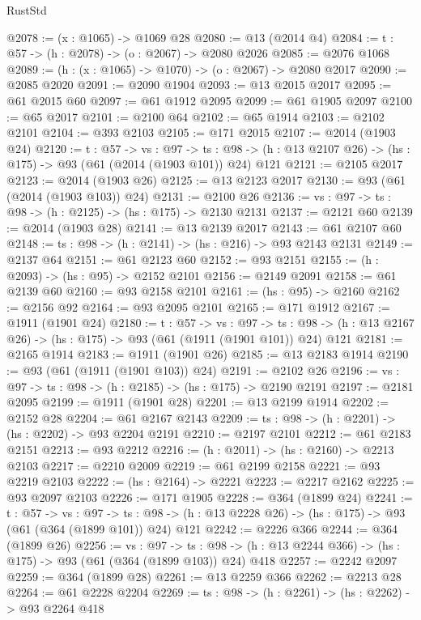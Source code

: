 \begin{lexlean}{RustStd}
\begin{coremodule}
@2078 := (x : @1065) -> @1069 @28
@2080 := @13 (@2014 @4)
@2084 := {t : @57} -> (h : @2078) -> (o : @2067) -> @2080 @2026
@2085 := @2076 @1068
@2089 := (h : (x : @1065) -> @1070) -> (o : @2067) -> @2080 @2017
@2090 := @2085 @2020
@2091 := @2090 @1904
@2093 := @13 @2015 @2017
@2095 := @61 @2015 @60
@2097 := @61 @1912 @2095
@2099 := @61 @1905 @2097
@2100 := @65 @2017
@2101 := @2100 @64
@2102 := @65 @1914
@2103 := @2102 @2101
@2104 := @393 @2103
@2105 := @171 @2015
@2107 := @2014 (@1903 @24)
@2120 := {t : @57} ->
  {vs : @97} ->
  {ts : @98} -> (h : @13 @2107 @26) -> (hs : @175) -> @93 (@61 (@2014 (@1903 @101)) @24) @121
@2121 := @2105 @2017
@2123 := @2014 (@1903 @26)
@2125 := @13 @2123 @2017
@2130 := @93 (@61 (@2014 (@1903 @103)) @24)
@2131 := @2100 @26
@2136 := {vs : @97} -> {ts : @98} -> (h : @2125) -> (hs : @175) -> @2130 @2131
@2137 := @2121 @60
@2139 := @2014 (@1903 @28)
@2141 := @13 @2139 @2017
@2143 := @61 @2107 @60
@2148 := {ts : @98} -> (h : @2141) -> (hs : @216) -> @93 @2143 @2131
@2149 := @2137 @64
@2151 := @61 @2123 @60
@2152 := @93 @2151
@2155 := (h : @2093) -> (hs : @95) -> @2152 @2101
@2156 := @2149 @2091
@2158 := @61 @2139 @60
@2160 := @93 @2158 @2101
@2161 := (hs : @95) -> @2160
@2162 := @2156 @92
@2164 := @93 @2095 @2101
@2165 := @171 @1912
@2167 := @1911 (@1901 @24)
@2180 := {t : @57} ->
  {vs : @97} ->
  {ts : @98} -> (h : @13 @2167 @26) -> (hs : @175) -> @93 (@61 (@1911 (@1901 @101)) @24) @121
@2181 := @2165 @1914
@2183 := @1911 (@1901 @26)
@2185 := @13 @2183 @1914
@2190 := @93 (@61 (@1911 (@1901 @103)) @24)
@2191 := @2102 @26
@2196 := {vs : @97} -> {ts : @98} -> (h : @2185) -> (hs : @175) -> @2190 @2191
@2197 := @2181 @2095
@2199 := @1911 (@1901 @28)
@2201 := @13 @2199 @1914
@2202 := @2152 @28
@2204 := @61 @2167 @2143
@2209 := {ts : @98} -> (h : @2201) -> (hs : @2202) -> @93 @2204 @2191
@2210 := @2197 @2101
@2212 := @61 @2183 @2151
@2213 := @93 @2212
@2216 := (h : @2011) -> (hs : @2160) -> @2213 @2103
@2217 := @2210 @2009
@2219 := @61 @2199 @2158
@2221 := @93 @2219 @2103
@2222 := (hs : @2164) -> @2221
@2223 := @2217 @2162
@2225 := @93 @2097 @2103
@2226 := @171 @1905
@2228 := @364 (@1899 @24)
@2241 := {t : @57} ->
  {vs : @97} ->
  {ts : @98} -> (h : @13 @2228 @26) -> (hs : @175) -> @93 (@61 (@364 (@1899 @101)) @24) @121
@2242 := @2226 @366
@2244 := @364 (@1899 @26)
@2256 := {vs : @97} ->
  {ts : @98} -> (h : @13 @2244 @366) -> (hs : @175) -> @93 (@61 (@364 (@1899 @103)) @24) @418
@2257 := @2242 @2097
@2259 := @364 (@1899 @28)
@2261 := @13 @2259 @366
@2262 := @2213 @28
@2264 := @61 @2228 @2204
@2269 := {ts : @98} -> (h : @2261) -> (hs : @2262) -> @93 @2264 @418

\end{coremodule}
\end{lexlean}
